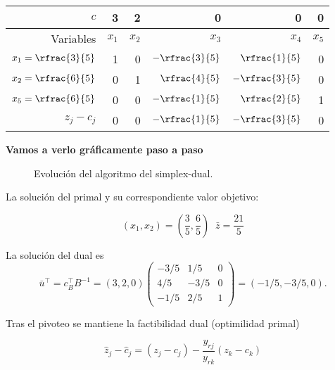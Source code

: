 \begin{example}
\begin{center}
\begin{tabular}{r | rrrrr}
$c$ & 3 & 2 & 0 & 0 & 0 \\ \hline
Variables & $x_1$ & $x_2$ & $x_3$ & $x_4$ & $x_5$ \\ \hline
$x_1 = \rfrac{3}{5}$ & 1 & 0 & $-\rfrac{3}{5}$ & $\rfrac{1}{5}$ & 0 \\
$x_2=  \rfrac{6}{5}$   & 0 & 1 & $\rfrac{4}{5}$ & $-\rfrac{3}{5}$ & 0  \\
$x_5=\rfrac{6}{5}$ & 0 & 0 & $-\rfrac{1}{5}$ & $\rfrac{2}{5}$ & 1 \\ \hline
$z_j-c_j$ & 0 & 0 & $-\rfrac{1}{5}$ & $-\rfrac{3}{5}$ & 0 
\end{tabular}
\end{center}



\textbf{Vamos a verlo gráficamente paso a paso}

\begin{figure}[hbtp]
\centering
{}
\caption{Evolución del algoritmo del simplex-dual.}
\end{figure}

La solución del primal y su correspondiente valor objetivo:

\[\left(x_1,x_2\right) = \left(\frac{3}{5},\frac{6}{5}\right) \;\;\bar{z}=\frac{21}{5}\]


La solución del dual es 
\[
\bar{u}^\top = c_B^\top B^{-1} = 
	(3,2,0)
		\begin{pmatrix}
			-3/5 & 1/5 & 0 \\ 
			4/5 & -3/5 & 0 \\ 
			-1/5 & 2/5 & 1
		\end{pmatrix} = (-1/5,-3/5,0).
\]


\end{example}


\begin{prop}
Tras el pivoteo se mantiene la factibilidad dual (optimilidad primal)

\[
	\hat{z}_j - \hat{c}_j = (z_j-c_j) - \frac{y_{rj}}{y_{rk}} (z_k-c_k)
\]

\end{prop}


